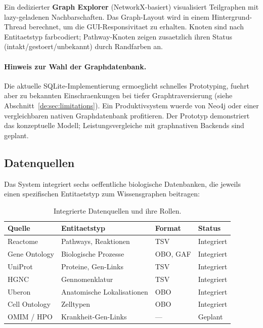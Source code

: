 \documentclass[12pt,a4paper]{article}
\begin{document}
Ein dedizierter \textbf{Graph Explorer} (NetworkX-basiert) visualisiert Teilgraphen mit lazy-geladenen Nachbarschaften. Das Graph-Layout wird in einem Hintergrund-Thread berechnet, um die GUI-Responsivitaet zu erhalten. Knoten sind nach Entitaetstyp farbcodiert; Pathway-Knoten zeigen zusaetzlich ihren Status (intakt/gestoert/unbekannt) durch Randfarben an.

\paragraph{Hinweis zur Wahl der Graphdatenbank.} Die aktuelle SQLite-Implementierung ermoeglicht schnelles Prototyping, fuehrt aber zu bekannten Einschraenkungen bei tiefer Graphtraversierung (siehe Abschnitt~\ref{de:sec:limitations}). Ein Produktivsystem wuerde von Neo4j oder einer vergleichbaren nativen Graphdatenbank profitieren. Der Prototyp demonstriert das konzeptuelle Modell; Leistungsvergleiche mit graphnativen Backends sind geplant.

\subsection*{Datenquellen}
\label{de:sec:datasources}

Das System integriert sechs oeffentliche biologische Datenbanken, die jeweils einen spezifischen Entitaetstyp zum Wissensgraphen beitragen:

\begin{table}[H]
\centering
\caption{Integrierte Datenquellen und ihre Rollen.}
\label{de:tab:datasources}
\begin{tabular}{llll}
\toprule
\textbf{Quelle} & \textbf{Entitaetstyp} & \textbf{Format} & \textbf{Status} \\
\midrule
Reactome \citep{Fabregat2018} & Pathways, Reaktionen & TSV & Integriert \\
Gene Ontology \citep{Ashburner2000} & Biologische Prozesse & OBO, GAF & Integriert \\
UniProt \citep{UniProt2023} & Proteine, Gen-Links & TSV & Integriert \\
HGNC \citep{Braschi2019} & Gennomenklatur & TSV & Integriert \\
Uberon \citep{Mungall2012} & Anatomische Lokalisationen & OBO & Integriert \\
Cell Ontology \citep{Diehl2016} & Zelltypen & OBO & Integriert \\
OMIM / HPO \citep{Robinson2008} & Krankheit-Gen-Links & --- & Geplant \\
\bottomrule
\end{tabular}
\end{table}
\end{document}
